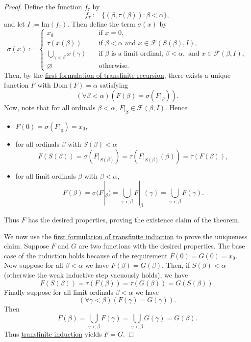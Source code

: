 \documentclass[a4paper,11pt]{article}
\theoremstyle{plain}
\theoremstyle{definition}
\theoremstyle{remark}
\begin{document}
\begin{proof}
Define the function $f_\tau$ by 
\[f_\tau := \{(\beta,\tau(\beta)) : \beta < \alpha\},\]
and let $I := \mathrm{Im}(f_\tau)$. Then define the term $\sigma(x)$ by
\[
\sigma(x) := \begin{cases}
x_0 \quad &\text{if } x = 0,\\
\tau(x(\beta)) \quad &\text{if } \beta<\alpha \text{ and } x \in \mathscr F(S(\beta), I),\\
\bigcup_{\gamma<\beta} x(\gamma) \quad &\text{if } \beta \text{ is a limit ordinal, } \beta < \alpha, \text{ and } x \in \mathscr F(\beta, I), \\
\varnothing \quad &\text{otherwise}.
\end{cases}
\]
Then, by the \hyperref[thm:Trecursion1]{first formulation of transfinite recursion}, there exists a unique function $F$ with $\mathrm{Dom}(F) = \alpha$ satisfying
\[(\forall\beta<\alpha)(F(\beta) = \sigma(F|_\beta)).\]
Now, note that for all ordinals $\beta<\alpha$, $F|_\beta \in \mathscr F(\beta, I)$. Hence
\begin{itemize}
\item $F(0) = \sigma(F|_0) = x_0$,
\item for all ordinals $\beta$ with $S(\beta) < \alpha$
\[F(S(\beta)) = \sigma\left(F|_{S(\beta)}\right) = \tau\left(F|_{S(\beta)}(\beta)\right) = \tau(F(\beta)),\]
\item for all limit ordinals $\beta$ with $\beta < \alpha$,
\[F(\beta) = \sigma(F|_\beta) = \bigcup_{\gamma<\beta} F|_{\beta}(\gamma) = \bigcup_{\gamma<\beta} F(\gamma).\]
\end{itemize}
Thus $F$ has the desired properties, proving the existence claim of the theorem. 

We now use the \hyperref[thm:Tinduction1]{first formulation of transfinite induction} to prove the uniqueness claim. Suppose $F$ and $G$ are two functions with the desired properties. The base case of the induction holds because of the requirement $F(0) = G(0) = x_0$. Now suppose for all $\beta < \alpha$ we have $F(\beta) = G(\beta)$. Then, if $S(\beta) < \alpha$ (otherwise the weak inductive step vacuously holds), we have
\[F(S(\beta)) = \tau(F(\beta)) = \tau(G(\beta)) = G(S(\beta)).\]
Finally suppose for all limit ordinals $\beta < \alpha$ we have 
\[(\forall\gamma<\beta)(F(\gamma) = G(\gamma)).\]
Then
\[F(\beta) = \bigcup_{\gamma<\beta} F(\gamma) = \bigcup_{\gamma<\beta} G(\gamma) = G(\beta).\]
Thus \hyperref[thm:Tinduction1]{transfinite induction} yields $F = G$.
\end{proof}
\end{document}
